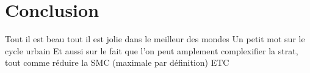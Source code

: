 \section{Conclusion}

Tout il est beau tout il est jolie dans le meilleur des mondes
Un petit mot sur le cycle urbain
Et aussi sur le fait que l'on peut amplement complexifier la strat, tout comme réduire la SMC (maximale par définition)
ETC

